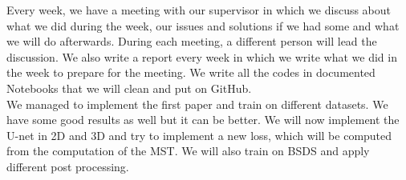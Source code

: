 \documentclass{article}
\begin{document}
Every week, we have a meeting with our supervisor in which we discuss about what we did during the week, our issues and solutions if we had some and what we will do afterwards. During each meeting, a different person will lead the discussion. We also write a report every week in which we write what we did in the week to prepare for the meeting. We write all the codes in documented Notebooks that we will clean and put on GitHub. \\

We managed to implement the first paper and train on different datasets. We have some good results as well but it can be better. We will now implement the U-net in 2D and 3D and try to implement a new loss, which will be computed from the computation of the MST. We will also train on BSDS and apply different post processing. \\
\end{document}
